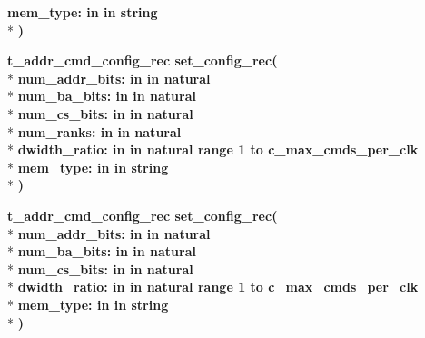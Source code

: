 \begin{DoxyCompactItemize}
{\bfseries \textcolor{vhdlchar}{mem\+\_\+type\+: }\textcolor{stringliteral}{in }\textcolor{vhdlchar}{in string}}\\*
{\bfseries  )} 
\item 
{\bfseries {\bfseries {\bfseries {\bf t\+\_\+addr\+\_\+cmd\+\_\+config\+\_\+rec}} \textcolor{vhdlchar}{ }}} {\bf set\+\_\+config\+\_\+rec}{\bfseries  ( }\\*
{\bfseries \textcolor{vhdlchar}{num\+\_\+addr\+\_\+bits\+: }\textcolor{stringliteral}{in }\textcolor{vhdlchar}{in natural}}\\*
{\bfseries \textcolor{vhdlchar}{num\+\_\+ba\+\_\+bits\+: }\textcolor{stringliteral}{in }\textcolor{vhdlchar}{in natural}}\\*
{\bfseries \textcolor{vhdlchar}{num\+\_\+cs\+\_\+bits\+: }\textcolor{stringliteral}{in }\textcolor{vhdlchar}{in natural}}\\*
{\bfseries \textcolor{vhdlchar}{num\+\_\+ranks\+: }\textcolor{stringliteral}{in }\textcolor{vhdlchar}{in natural}}\\*
{\bfseries \textcolor{vhdlchar}{dwidth\+\_\+ratio\+: }\textcolor{stringliteral}{in }\textcolor{vhdlchar}{in natural   range  1 to    c\+\_\+max\+\_\+cmds\+\_\+per\+\_\+clk}}\\*
{\bfseries \textcolor{vhdlchar}{mem\+\_\+type\+: }\textcolor{stringliteral}{in }\textcolor{vhdlchar}{in string}}\\*
{\bfseries  )} 
\item 
{\bfseries {\bfseries {\bfseries {\bf t\+\_\+addr\+\_\+cmd\+\_\+config\+\_\+rec}} \textcolor{vhdlchar}{ }}} {\bf set\+\_\+config\+\_\+rec}{\bfseries  ( }\\*
{\bfseries \textcolor{vhdlchar}{num\+\_\+addr\+\_\+bits\+: }\textcolor{stringliteral}{in }\textcolor{vhdlchar}{in natural}}\\*
{\bfseries \textcolor{vhdlchar}{num\+\_\+ba\+\_\+bits\+: }\textcolor{stringliteral}{in }\textcolor{vhdlchar}{in natural}}\\*
{\bfseries \textcolor{vhdlchar}{num\+\_\+cs\+\_\+bits\+: }\textcolor{stringliteral}{in }\textcolor{vhdlchar}{in natural}}\\*
{\bfseries \textcolor{vhdlchar}{dwidth\+\_\+ratio\+: }\textcolor{stringliteral}{in }\textcolor{vhdlchar}{in natural   range  1 to    c\+\_\+max\+\_\+cmds\+\_\+per\+\_\+clk}}\\*
{\bfseries \textcolor{vhdlchar}{mem\+\_\+type\+: }\textcolor{stringliteral}{in }\textcolor{vhdlchar}{in string}}\\*
{\bfseries  )} 
\item 

\end{DoxyCompactItemize}
